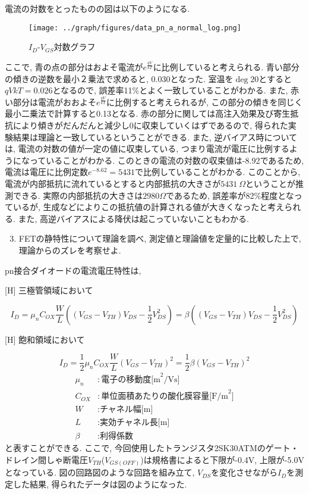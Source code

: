 \documentclass[a4j,dvipdfmx,titlepage]{article}
\begin{document}
電流の対数をとったものの図は以下のようになる. 
\begin{figure}[H]
  \begin{center}
  \texttt{[image: ../graph/figures/data\_pn\_a\_normal\_log.png]}
  \caption{$I_D$-$V_{GS}$対数グラフ}
  \end{center}
\end{figure}
ここで, 青の点の部分はおよそ電流が$e^{\frac{qV}{kT}}$に比例していると考えられる. 青い部分の傾きの逆数を最小２乗法で求めると, 0.030となった. 室温を$\deg{20}$とすると${qV}{kT}=0.026$となるので, 誤差率11\%とよく一致していることがわかる. また, 赤い部分は電流がおおよそ$e^{\frac{qV}{kT}}$に比例すると考えられるが, この部分の傾きを同じく最小二乗法で計算すると0.13となる. 赤の部分に関しては高注入効果及び寄生抵抗により傾きがだんだんと減少し0に収束していくはずであるので, 得られた実験結果は理論と一致しているということができる. また, 逆バイアス時については, 電流の対数の値が一定の値に収束している, つまり電流が電圧に比例するようになっていることがわかる. このときの電流の対数の収束値は-8.92であるため, 電流は電圧に比例定数$e^{-8.62}=5431$で比例していることがわかる. このことから, 電流が内部抵抗に流れているとすると内部抵抗の大きさが$5431\ \Omega$ということが推測できる. 実際の内部抵抗の大きさは$2980\Omega$であるため, 誤差率が82\%程度となっているが, 生成などによりこの抵抗値の計算される値が大きくなったと考えられる. また, 高逆バイアスによる降伏は起こっていないこともわかる. 

\begin{enumerate}[label={(\arabic*)}]
  \setcounter{enumi}{2}
  \item FETの静特性について理論を調べ, 測定値と理論値を定量的に比較した上で, 理論からのズレを考察せよ. 
\end{enumerate}

pn接合ダイオードの電流電圧特性は, \\
\begin{center}[H]
  三極管領域において
\end{center}
$$
I_D = \mu_nC_{OX}\frac{W}{L}\left((V_{GS}-V_{TH})V_{DS} - \frac{1}{2}V_{DS}^2\right) = \beta\left((V_{GS}-V_{TH})V_{DS} - \frac{1}{2}V_{DS}^2\right)
$$
\begin{center}[H]
    飽和領域において
\end{center}
$$
I_D = \frac{1}{2}\mu_nC_{OX}\frac{W}{L}\left(V_{GS}-V_{TH}\right)^2 = \frac{1}{2}\beta(V_{GS}-V_{TH})^2
$$
\begin{align}[H]
  \mu_n &: \mbox{電子の移動度[m}^2\mbox{/Vs]}\nonumber \\
  C_{OX} &: \mbox{単位面積あたりの酸化膜容量[F/m}^2\mbox{]} \nonumber \\
  W &: \mbox{チャネル幅[m]} \nonumber \\
  L &: \mbox{実効チャネル長[m]} \nonumber \\
  \beta &: \mbox{利得係数} \nonumber
\end{align}
と表すことができる. ここで, 今回使用したトランジスタ2SK30ATMのゲート・ドレイン間しゃ断電圧$V_{TH}$($V_{GS(OFF)}$)は規格書によると下限が-0.4V, 上限が-5.0Vとなっている. 図の回路図のような回路を組み立て, $V_{DS}$を変化させながら$I_D$を測定した結果, 得られたデータは図のようになった. 
\end{document}
